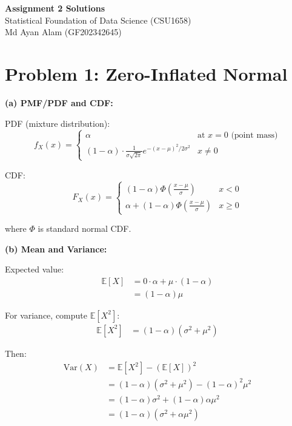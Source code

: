 \documentclass[10pt,twocolumn]{article}
\begin{document}
\begin{center}
\Large\textbf{Assignment 2 Solutions}\\[4pt]
\normalsize Statistical Foundation of Data Science (CSU1658)\\[2pt]
Md Ayan Alam (GF202342645)
\end{center}

\vspace{-6pt}

\section*{Problem 1: Zero-Inflated Normal}

\textbf{(a) PMF/PDF and CDF:}

PDF (mixture distribution):
\[
f_X(x) = \begin{cases}
\alpha & \text{at } x=0 \text{ (point mass)} \\
(1-\alpha) \cdot \frac{1}{\sigma\sqrt{2\pi}} e^{-(x-\mu)^2/2\sigma^2} & x \neq 0
\end{cases}
\]

CDF:
\[
F_X(x) = \begin{cases}
(1-\alpha)\Phi\left(\frac{x-\mu}{\sigma}\right) & x < 0 \\[6pt]
\alpha + (1-\alpha)\Phi\left(\frac{x-\mu}{\sigma}\right) & x \geq 0
\end{cases}
\]

where \(\Phi\) is standard normal CDF.

\textbf{(b) Mean and Variance:}

Expected value:
\begin{align*}
\mathbb{E}[X] &= 0 \cdot \alpha + \mu \cdot (1-\alpha) \\
&= \boxed{(1-\alpha)\mu}
\end{align*}

For variance, compute \(\mathbb{E}[X^2]\):
\begin{align*}
\mathbb{E}[X^2] &= (1-\alpha)(\sigma^2 + \mu^2)
\end{align*}

Then:
\begin{align*}
\text{Var}(X) &= \mathbb{E}[X^2] - (\mathbb{E}[X])^2 \\
&= (1-\alpha)(\sigma^2 + \mu^2) - (1-\alpha)^2\mu^2 \\
&= (1-\alpha)\sigma^2 + (1-\alpha)\alpha\mu^2 \\
&= \boxed{(1-\alpha)(\sigma^2 + \alpha\mu^2)}
\end{align*}
\end{document}
